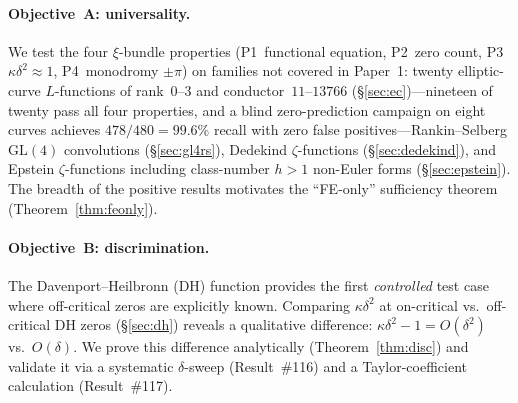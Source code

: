 \documentclass[11pt, a4paper]{article}
\theoremstyle{plain}
\theoremstyle{definition}
\begin{document}
\paragraph{Objective~A: universality.}
We test the four $\xi$-bundle properties (P1~functional equation,
P2~zero count, P3~$\kappa\delta^{2}\approx 1$, P4~monodromy $\pm\pi$)
on families not covered in Paper~1: twenty elliptic-curve
$L$-functions of rank~$0$--$3$ and conductor~$11$--$13766$
(\S\ref{sec:ec})---nineteen of twenty pass all four properties,
and a blind zero-prediction campaign on eight curves achieves
$478/480 = 99.6\%$ recall with zero false positives---Rankin--Selberg
$\mathrm{GL}(4)$ convolutions (\S\ref{sec:gl4rs}), Dedekind
$\zeta$-functions (\S\ref{sec:dedekind}), and Epstein
$\zeta$-functions including class-number $h>1$ non-Euler forms
(\S\ref{sec:epstein}).  The breadth of the positive results motivates
the ``FE-only'' sufficiency theorem (Theorem~\ref{thm:feonly}).

\paragraph{Objective~B: discrimination.}
The Davenport--Heilbronn (DH) function provides the first
\emph{controlled} test case where off-critical zeros are explicitly
known.  Comparing $\kappa\delta^{2}$ at on-critical vs.\ off-critical
DH zeros (\S\ref{sec:dh}) reveals a qualitative difference:
$\kappa\delta^{2}-1 = O(\delta^{2})$ vs.\ $O(\delta)$.  We prove this
difference analytically (Theorem~\ref{thm:disc}) and validate it via a systematic
$\delta$-sweep (Result~\#116) and a Taylor-coefficient calculation
(Result~\#117).
\end{document}

